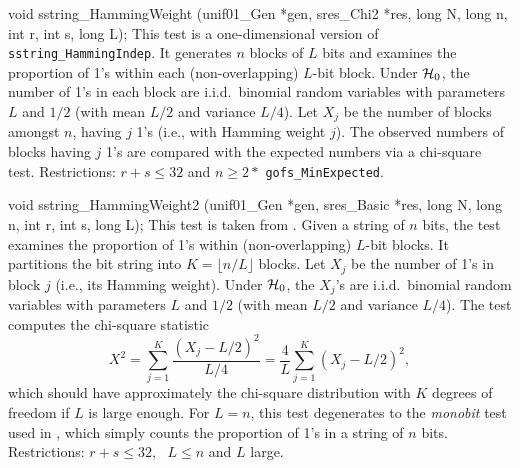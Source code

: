 void sstring_HammingWeight (unif01_Gen *gen, sres_Chi2 *res,
                            long N, long n, int r, int s, long L);
\endcode
 \tab
  This test is a one-dimensional version of {\tt sstring\_HammingIndep}.
  It generates $n$ blocks of $L$ bits and examines the proportion of 1's
  within each  (non-overlapping) $L$-bit block.
  Under $\mathcal{H}_0$, the number of 1's in each block are
  i.i.d.\ binomial random variables
  with parameters $L$ and $1/2$ (with mean $L/2$ and variance $L/4$).
  Let $X_j$ be the number of blocks amongst $n$, having $j$ 1's
  (i.e., with Hamming weight $j$).
  The observed numbers of blocks having $j$ 1's are compared
  with the expected numbers via a chi-square test.
  Restrictions: $r + s \le 32$ and $n \ge 2*$ {\tt gofs\_MinExpected}.
 \endtab
\code


void sstring_HammingWeight2 (unif01_Gen *gen, sres_Basic *res,
                             long N, long n, int r, int s, long L);
\endcode
 \tab
{}
  This test is taken from  \cite{rRUK01a}.
  Given a string of $n$ bits, the test examines the proportion of 1's
  within (non-overlapping) $L$-bit blocks. It partitions the bit string into
  $K = \lfloor n/L \rfloor$  blocks.
  Let $X_j$ be the number of 1's in block $j$ (i.e., its Hamming weight).
  Under $\mathcal{H}_0$, the $X_j$'s are i.i.d.\ binomial random variables
  with parameters $L$ and $1/2$ (with mean $L/2$ and variance $L/4$).
  The test computes the chi-square statistic
$$
   X^2 = \sum_{j=1}^K \frac{(X_j - L/2)^2}{L/4}
       = \frac{4}{L} \sum_{j=1}^K (X_j - L/2)^2,
$$
  which should have approximately the chi-square distribution with $K$
  degrees of freedom if $L$ is large enough.
  For $L=n$, this test degenerates to the {\em monobit\/} test
  used in \cite{rRUK01a}, which simply counts the proportion of 1's
  in a string of $n$ bits.
  Restrictions: $r + s \le 32$, \ $ L \le n$ and  $L$ large.
 \endtab
\code


